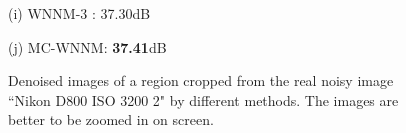 \documentclass[10pt,onecolumn,letterpaper]{article}
\begin{document}
\begin{figure}[!htbp]
{\begin{minipage}[t]{0.25\textwidth}
{\footnotesize (i) WNNM-3 \cite{wnnm}: 37.30dB}
\end{minipage}
\begin{minipage}[t]{0.25\textwidth}
\centering
{}
{\footnotesize (j) MC-WNNM: \textbf{37.41}dB}
\end{minipage}
}
\caption{Denoised images of a region cropped from the real noisy image ``Nikon D800 ISO 3200 2" \cite{crosschannel2016} by different methods. The images are better to be zoomed in on screen.}
\label{f13}
\end{figure}
\end{document}
